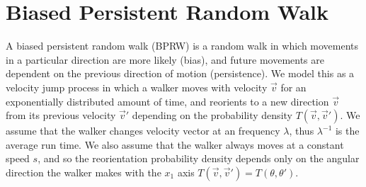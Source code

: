 

\section{Biased Persistent Random Walk}

A biased persistent random walk (BPRW) is a random walk in which movements in a particular direction are more likely (bias), and future movements are dependent on the previous direction of motion (persistence). We model this as a velocity jump process in which a walker moves with velocity $\vec{v}$ for an exponentially distributed amount of time, and reorients to a new direction $\vec{v}$ from its previous velocity $\vec{v}'$ depending on the probability density $T(\vec{v},\vec{v}')$. We assume that the walker changes velocity vector at an frequency $\lambda$, thus $\lambda^{-1}$ is the average run time. We also assume that the walker always moves at a constant speed $s$, and so the reorientation probability density depends only on the angular direction the walker makes with the $x_1$ axis $T(\vec{v},\vec{v}') = T(\theta,\theta')$.

